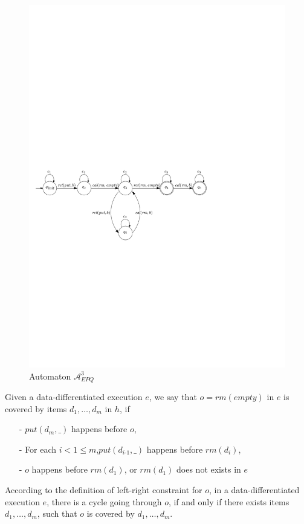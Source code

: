 \begin{figure}[htbp]
  \centering
  \includegraphics[width=0.8 \textwidth]{figures/PIC_AUTO_PQ3.pdf}
  \caption{Automaton $\mathcal{A}_{\textit{EPQ}}^3$}
  \label{fig:automata for PQ3}
\end{figure}

Given a data-differentiated execution $e$, we say that $o = \textit{rm}(\textit{empty})$ in $e$ is covered by items $d_1,\ldots,d_m$ in $h$, if

\begin{itemize}
\setlength{\itemsep}{0.5pt}
\item[-] $\textit{put}(d_m,\_)$ happens before $o$,

\item[-] For each $i < 1 \leq m$,$\textit{put}(d_{\textit{i-1}},\_)$ happens before $\textit{rm}(d_i)$,

\item[-] $o$ happens before $\textit{rm}(d_1)$, or $\textit{rm}(d_1)$ does not exists in $e$
\end{itemize}

According to the definition of left-right constraint for $o$, in a data-differentiated execution $e$, there is a cycle going through $o$, if and only if there exists items $d_1,\ldots,d_m$, such that $o$ is covered by $d_1,\ldots,d_m$.


